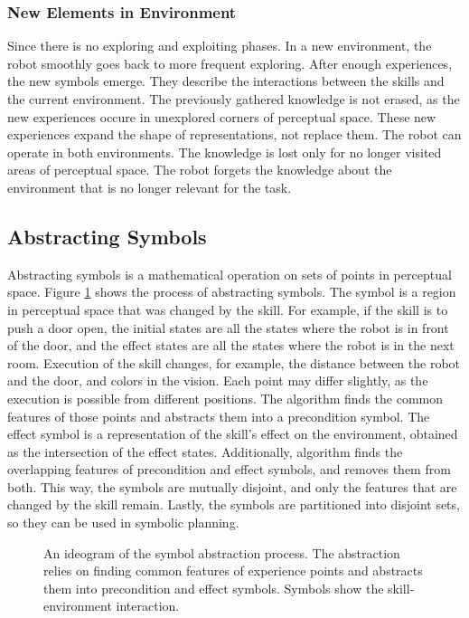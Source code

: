 \subsubsection*{New Elements in Environment}
Since there is no exploring and exploiting phases. In a new environment, the robot smoothly goes back to more frequent exploring. After enough experiences, the new symbols emerge. They describe the interactions between the skills and the current environment. The previously gathered knowledge is not erased, as the new experiences occure in unexplored corners of perceptual space. These new experiences expand the shape of representations, not replace them. The robot can operate in both environments. The knowledge is lost only for no longer visited areas of perceptual space. The robot forgets the knowledge about the environment that is no longer relevant for the task. 

\subsection{Abstracting Symbols}
Abstracting symbols is a mathematical operation on sets of points in perceptual space. Figure \ref{fig:abstracting_symbols} shows the process of abstracting symbols. The symbol is a region in perceptual space that was changed by the skill. For example, if the skill is to push a door open, the initial states are all the states where the robot is in front of the door, and the effect states are all the states where the robot is in the next room. Execution of the skill changes, for example, the distance between the robot and the door, and colors in the vision. Each point may differ slightly, as the execution is possible from different positions. The algorithm finds the common features of those points and abstracts them into a precondition symbol. The effect symbol is a representation of the skill's effect on the environment, obtained as the intersection of the effect states. Additionally, algorithm finds the overlapping features of precondition and effect symbols, and removes them from both. This way, the symbols are mutually disjoint, and only the features that are changed by the skill remain. Lastly, the symbols are partitioned into disjoint sets, so they can be used in symbolic planning.

\begin{figure}[htbp]
    \centering
    {
        
    }
    \caption{An ideogram of the symbol abstraction process. The abstraction relies on finding common features of experience points and abstracts them into precondition and effect symbols. Symbols show the skill-environment interaction.} 
    \label{fig:abstracting_symbols}
\end{figure}


